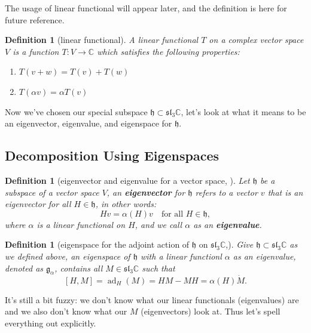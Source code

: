 \documentclass[a4paper]{article}
\newcommand{\C}{\mathbb{C}}
\theoremstyle{bfnote} %
\theoremstyle{bfnote}                  %
\newtheorem{defn}[thm]{Definition}
\theoremstyle{example}                       %
\theoremstyle{remark}                       %
\numberwithin{equation}{section}
\begin{document}
\bigskip

The usage of linear functional will appear later, and the definition is here for future reference.
\begin{defn}[linear functional]\label{linearFunctional}
	A linear functional $T$ on a complex vector space  $V$ is a function  $T: V \to \C$ which satisfies the following properties:
	\begin{enumerate}
		\item $T(v+w) = T(v) + T(w)$ 
		\item $T(\alpha v) = \alpha T(v)$
	\end{enumerate}
\end{defn}

Now we've chosen our special subspace $\mathfrak{h} \subset \mathfrak{sl}_3\C$, let's look at what it means to be an eigenvector, eigenvalue, and eigenspace for $\mathfrak{h}$.
\subsection{Decomposition Using Eigenspaces}

\begin{defn}[eigenvector and eigenvalue for a vector space, \cite{fulton}]
	Let $\mathfrak{h}$ be a subspace of a vector space $V$, an  \textbf{eigenvector} for $\mathfrak{h}$ refers to a vector  $v$ that is an eigenvector for all  $H \in \mathfrak{h}$, in other words: \[
		H v = \alpha(H) v \quad \text{for all $H \in \mathfrak{h}$},
	\]  where $\alpha$ is a linear functional on  $H$, and we call $\alpha$ as an \textbf{eigenvalue}. 
\end{defn}

\begin{defn}[eigenspace for the adjoint action of $\mathfrak{h}$ on  $\mathfrak{sl}_3\C$,\cite{fulton}]
	 Give $\mathfrak{h} \subset \mathfrak{sl}_3\C$ as we defined above, an eigenspace of $\mathfrak{h}$ with a linear functionl  $\alpha$ as an eigenvalue, denoted as  $\mathfrak{g}_{\alpha}$, contains all $M \in \mathfrak{sl}_3\C$ such that \[
		 \left[ H,M \right] = \operatorname{ad}_{H}(M) = HM - MH = \alpha(H) \dot M. 
	 \] 
\end{defn}

\bigskip

It's still a bit fuzzy: we don't know what our linear functionals (eigenvalues) are and we also don't know what our $M$ (eigenvectors) look at. Thus let's spell everything out explicitly.
\end{document}
